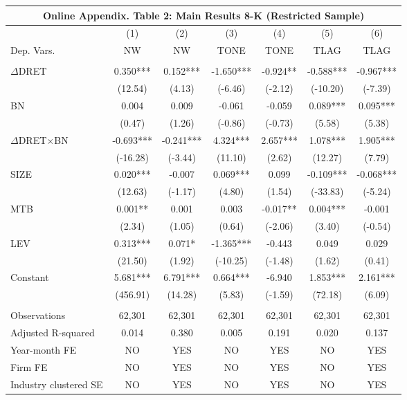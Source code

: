 \begin{table}[htbp] \label{oat2}
  \centering
    \begin{tabular}{lcccccc}
    \multicolumn{7}{c}{\textbf{Online Appendix. Table 2: Main Results 8-K (Restricted Sample)}} \\
    \midrule
      & (1) & (2) & (3) & (4) & (5) & (6) \\
    Dep. Vars. & NW & NW & TONE & TONE & TLAG & TLAG \\
    \midrule
      &   &   &   &   &   &  \\
    $\Delta$DRET & 0.350*** & 0.152*** & -1.650*** & -0.924** & -0.588*** & -0.967*** \\
    & (12.54) & (4.13) & (-6.46) & (-2.12) & (-10.20) & (-7.39) \\
    BN & 0.004 & 0.009 & -0.061 & -0.059 & 0.089*** & 0.095*** \\
    & (0.47) & (1.26) & (-0.86) & (-0.73) & (5.58) & (5.38) \\
    \rowcolor[rgb]{ .933,  .925,  .882} $\Delta$DRET$\times$BN & -0.693*** & -0.241*** & 4.324*** & 2.657*** & 1.078*** & 1.905*** \\
    \rowcolor[rgb]{ .933,  .925,  .882}   & (-16.28) & (-3.44) & (11.10) & (2.62) & (12.27) & (7.79) \\
    SIZE & 0.020*** & -0.007 & 0.069*** & 0.099 & -0.109*** & -0.068*** \\
    & (12.63) & (-1.17) & (4.80) & (1.54) & (-33.83) & (-5.24) \\
    MTB & 0.001** & 0.001 & 0.003 & -0.017** & 0.004*** & -0.001 \\
    & (2.34) & (1.05) & (0.64) & (-2.06) & (3.40) & (-0.54) \\
    LEV & 0.313*** & 0.071* & -1.365*** & -0.443 & 0.049 & 0.029 \\
    & (21.50) & (1.92) & (-10.25) & (-1.48) & (1.62) & (0.41) \\
    Constant & 5.681*** & 6.791*** & 0.664*** & -6.940 & 1.853*** & 2.161*** \\
    & (456.91) & (14.28) & (5.83) & (-1.59) & (72.18) & (6.09) \\
    &   &   &   &   &   &  \\
    Observations & 62,301 & 62,301 & 62,301 & 62,301 & 62,301 & 62,301 \\
    Adjusted R-squared & 0.014 & 0.380 & 0.005 & 0.191 & 0.020 & 0.137 \\
    Year-month FE & NO & YES & NO & YES & NO & YES \\
    Firm FE & NO & YES & NO & YES & NO & YES \\
    Industry clustered SE & NO & YES & NO & YES & NO & YES \\
    \bottomrule
    \end{tabular}%
\end{table}%
